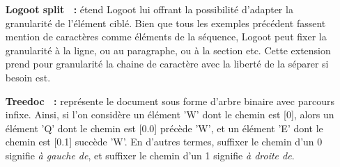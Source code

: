 \begin{itemize}
\item [\textbf{Logoot split~\cite{mehdi2014merging} :}] étend Logoot lui offrant
  la possibilité d'adapter la granularité de l'élément ciblé. Bien que tous les
  exemples précédent fassent mention de caractères comme éléments de la
  séquence, Logoot peut fixer la granularité à la ligne, ou au paragraphe, ou à
  la section etc. Cette extension prend pour granularité la chaine de caractère
  avec la liberté de la séparer si besoin est. 

\item [\textbf{Treedoc~\cite{shapiro2011comprehensive} :}] représente le
  document sous forme d'arbre binaire avec parcours infixe.  Ainsi, si l'on
  considère un élément 'W' dont le chemin est [0], alors un élément 'Q' dont le
  chemin est [0.0] précède 'W', et un élément 'E' dont le chemin est [0.1]
  succède 'W'. En d'autres termes, suffixer le chemin d'un 0 signifie \emph{à
    gauche de}, et suffixer le chemin d'un 1 signifie \emph{à droite de}.
\end{itemize}

